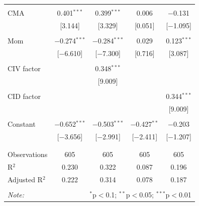 \documentclass[12pt]{article}
\begin{document}
\begin{table}[!htbp]
\begin{tabular}{@{\extracolsep{5pt}}lcccc}
  & & & & \\ 
 CMA & 0.401$^{***}$ & 0.399$^{***}$ & 0.006 & $-$0.131 \\ 
  & [3.144] & [3.329] & [0.051] & [$-$1.095] \\ 
  & & & & \\ 
 Mom & $-$0.274$^{***}$ & $-$0.284$^{***}$ & 0.029 & 0.123$^{***}$ \\ 
  & [$-$6.610] & [$-$7.300] & [0.716] & [3.087] \\ 
  & & & & \\ 
 CIV factor &  & 0.348$^{***}$ &  &  \\ 
  &  & [9.009] &  &  \\ 
  & & & & \\ 
 CID factor &  &  &  & 0.344$^{***}$ \\ 
  &  &  &  & [9.009] \\ 
  & & & & \\ 
 Constant & $-$0.652$^{***}$ & $-$0.503$^{***}$ & $-$0.427$^{**}$ & $-$0.203 \\ 
  & [$-$3.656] & [$-$2.991] & [$-$2.411] & [$-$1.207] \\ 
  & & & & \\ 
\hline \\[-1.8ex] 
Observations & 605 & 605 & 605 & 605 \\ 
R$^{2}$ & 0.230 & 0.322 & 0.087 & 0.196 \\ 
Adjusted R$^{2}$ & 0.222 & 0.314 & 0.078 & 0.187 \\ 
\hline 
\hline \\[-1.8ex] 
\textit{Note:}  & \multicolumn{4}{r}{$^{*}$p$<$0.1; $^{**}$p$<$0.05; $^{***}$p$<$0.01} \\ 
\end{tabular} 
\end{table}
\end{document}
